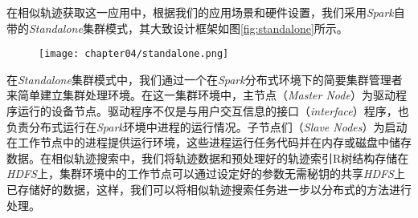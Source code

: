 在相似轨迹获取这一应用中，根据我们的应用场景和硬件设置，我们采用\emph{Spark}自带的\emph{Standalone}集群模式，其大致设计框架如图\ref{fig:standalone}\cite{hongzhi2017parallel}所示。

\begin{figure}[!htp]
  \centering
  \texttt{[image: chapter04/standalone.png]}
\end{figure}

在\emph{Standalone}集群模式中，我们通过一个在\emph{Spark}分布式环境下的简要集群管理者来简单建立集群处理环境。在这一集群环境中，主节点（\emph{Master Node}）为驱动程序运行的设备节点。驱动程序不仅是与用户交互信息的接口（\emph{interface}）程序，也负责分布式运行在\emph{Spark}环境中进程的运行情况。子节点们（\emph{Slave Nodes}）为启动在工作节点中的进程提供运行环境，这些进程运行任务代码并在内存或磁盘中储存数据。在相似轨迹搜索中，我们将轨迹数据和预处理好的轨迹索引R树结构存储在\emph{HDFS}上，集群环境中的工作节点可以通过设定好的参数无需秘钥的共享\emph{HDFS}上已存储好的数据，这样，我们可以将相似轨迹搜索任务进一步以分布式的方法进行处理。



